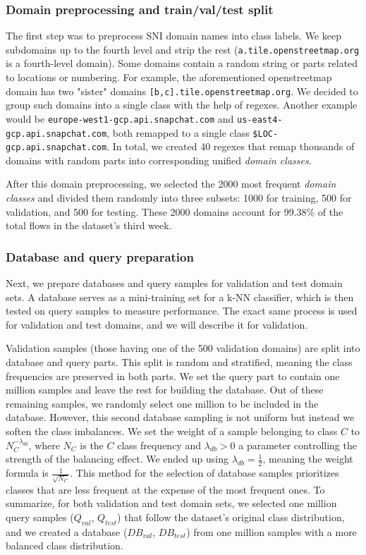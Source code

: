 \documentclass[lettersize,journal,twoside,article]{IEEEtran}
\begin{document}
\subsubsection{Domain preprocessing and train/val/test split}
\label{sec:domain-preprocess}
The first step was to preprocess SNI domain names into class labels. We keep subdomains up to the fourth level and strip the rest (\texttt{a.tile.openstreetmap.org} is a fourth-level domain). Some domains contain a random string or parts related to locations or numbering. For example, the aforementioned openstreetmap domain has two "sister" domains \texttt{[b,c].tile.openstreetmap.org}. We decided to group such domains into a single class with the help of regexes. Another example would be \texttt{europe-west1-gcp.api.snapchat.com} and \texttt{us-east4-gcp.api.snapchat.com}, both remapped to a single class \texttt{\$LOC-gcp.api.snapchat.com}. In total, we created 40 regexes that remap thousands of domains with random parts into corresponding unified \textit{domain classes}.

After this domain preprocessing, we selected the 2000 most frequent \textit{domain classes} and divided them randomly into three subsets: 1000 for training, 500 for validation, and 500 for testing. These 2000 domains account for 99.38\% of the total flows in the dataset's third week.

\subsubsection{Database and query preparation}
\label{sec:database-preparation}
Next, we prepare databases and query samples for validation and test domain sets. A database serves as a mini-training set for a k-NN classifier, which is then tested on query samples to measure performance. The exact same process is used for validation and test domains, and we will describe it for validation.

Validation samples (those having one of the 500 validation domains) are split into database and query parts. This split is random and stratified, meaning the class frequencies are preserved in both parts. We set the query part to contain one million samples and leave the rest for building the database. Out of these remaining samples, we randomly select one million to be included in the database. However, this second database sampling is not uniform but instead we soften the class imbalances. We set the weight of a sample belonging to class $C$ to $N_{C}^{-\lambda_{db}}$, where $N_C$ is the $C$ class frequency and $\lambda_{db} > 0$ a parameter controlling the strength of the balancing effect. We ended up using $\lambda_{db} = \frac{1}{2}$, meaning the weight formula is $\frac{1}{\sqrt{N_C}}$. This method for the selection of database samples prioritizes classes that are less frequent at the expense of the most frequent ones. To summarize, for both validation and test domain sets, we selected one million query samples ($Q_{val}$, $Q_{test}$) that follow the dataset's original class distribution, and we created a database ($DB_{val}$, $DB_{test}$) from one million samples with a more balanced class distribution. 
\end{document}
